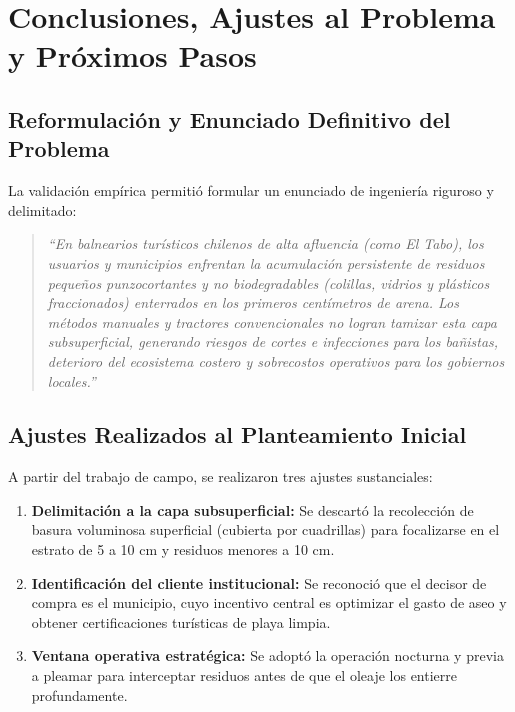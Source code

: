 \documentclass[12pt,letterpaper]{article}
\begin{document}
\section{Conclusiones, Ajustes al Problema y Próximos Pasos}

\subsection{Reformulación y Enunciado Definitivo del Problema}
La validación empírica permitió formular un enunciado de ingeniería riguroso y delimitado:
\begin{quote}
\textit{``En balnearios turísticos chilenos de alta afluencia (como El Tabo), los usuarios y municipios enfrentan la acumulación persistente de residuos pequeños punzocortantes y no biodegradables (colillas, vidrios y plásticos fraccionados) enterrados en los primeros centímetros de arena. Los métodos manuales y tractores convencionales no logran tamizar esta capa subsuperficial, generando riesgos de cortes e infecciones para los bañistas, deterioro del ecosistema costero y sobrecostos operativos para los gobiernos locales.''}
\end{quote}

\subsection{Ajustes Realizados al Planteamiento Inicial}
A partir del trabajo de campo, se realizaron tres ajustes sustanciales:
\begin{enumerate}[leftmargin=*, noitemsep, topsep=0pt]
    \item \textbf{Delimitación a la capa subsuperficial:} Se descartó la recolección de basura voluminosa superficial (cubierta por cuadrillas) para focalizarse en el estrato de 5 a 10 cm y residuos menores a 10 cm.
    \item \textbf{Identificación del cliente institucional:} Se reconoció que el decisor de compra es el municipio, cuyo incentivo central es optimizar el gasto de aseo y obtener certificaciones turísticas de playa limpia.
    \item \textbf{Ventana operativa estratégica:} Se adoptó la operación nocturna y previa a pleamar para interceptar residuos antes de que el oleaje los entierre profundamente.
\end{enumerate}
\end{document}
